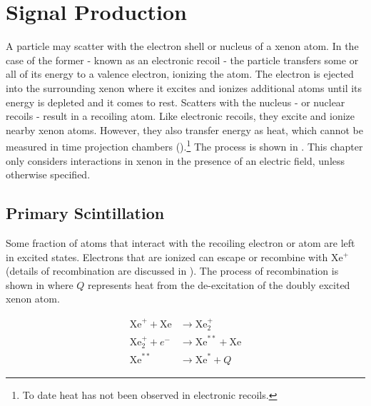\section{Signal Production}
\label{sec:scintillation}
A particle may scatter with the electron shell or nucleus of a xenon atom.  In the case of the former - known as an electronic recoil - the
particle transfers some or all of its energy to a valence electron, ionizing the atom.  The electron is ejected into the surrounding xenon
where it
excites and ionizes additional atoms until its energy is depleted and it comes to rest.  Scatters with the nucleus - or nuclear
recoils - result in a recoiling atom.  Like electronic recoils, they excite and ionize nearby xenon atoms.  However,
they also transfer energy as heat, which cannot be measured in time projection chambers ().\footnote{To date heat has not
been observed in electronic recoils.}  The process is shown in .  This chapter only considers interactions
in xenon in the presence of an electric field, unless otherwise specified.



\subsection{Primary Scintillation}
\label{subsec:primary}
Some fraction of atoms that interact with the recoiling electron or atom are left in excited states.  Electrons that are ionized
can escape or recombine with
Xe$^{+}$ (details of recombination are discussed in ).  The process of recombination is shown in
 where $Q$ represents heat from the de-excitation of the doubly excited xenon atom.

\vspace{-25pt}

\begin{subequations}
\begin{align}
\mathrm{Xe}^{+} + \mathrm{Xe} &\rightarrow \mathrm{Xe}_{2}^{+} \\
\mathrm{Xe}_{2}^{+} + e^{-} &\rightarrow \mathrm{Xe}^{**} + \mathrm{Xe} \label{eq:recomb_dimer_ionized} \\
\mathrm{Xe}^{**} &\rightarrow \mathrm{Xe}^{*} + Q
\end{align}
\label{eq:recomb}
\end{subequations}

\vspace{-25pt}


